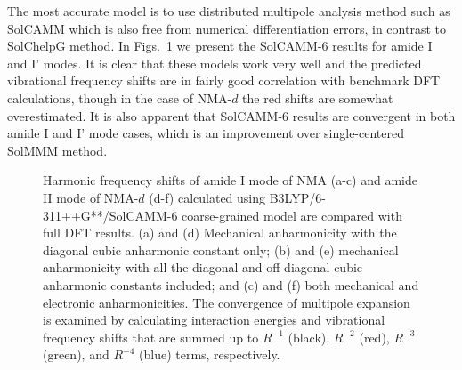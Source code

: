 \documentclass[a4paper,titlepage,twoside,fleqn,12pt]{book}
\begin{document}
\begin{refsection}
The most accurate model is to use
distributed multipole analysis method such as SolCAMM
which is also free from numerical differentiation errors,
in contrast to SolChelpG method.
In Figs.~\ref{f:solcamm} we present the SolCAMM-6 results 
for amide I and I' modes. It is clear that
these models work very well and the predicted 
vibrational frequency shifts are in fairly good correlation
with benchmark DFT calculations, though in the case of NMA-$d$
the red shifts are somewhat overestimated.
It is also apparent that SolCAMM-6 results are
convergent in both amide I and I' mode cases, which is
an improvement over single\hyp{}centered SolMMM method.
%
\begin{figure}[t!]
\centering
\setlength\fboxsep{0.4pt}
\setlength\fboxrule{0.5pt}
\caption{
Harmonic frequency shifts of amide I mode of NMA (a-c) and amide II mode
of NMA-$d$ (d-f) calculated using
B3LYP/6-311++G**/SolCAMM-6 coarse\hyp{}grained model
are compared with full DFT results. (a) and (d) Mechanical anharmonicity with the
diagonal cubic anharmonic constant only; (b) and (e) mechanical anharmonicity with
all the diagonal and off\hyp{}diagonal cubic anharmonic constants included; and
(c) and (f) both mechanical and electronic anharmonicities.
The convergence of multipole
expansion is examined by calculating interaction energies and vibrational frequency
shifts that are summed up to $R^{-1}$ (black), $R^{-2}$ (red), $R^{-3}$ (green), and
$R^{-4}$ (blue) terms, respectively.
\label{f:solcamm}}
\end{figure}
%


\end{refsection}
\end{document}
